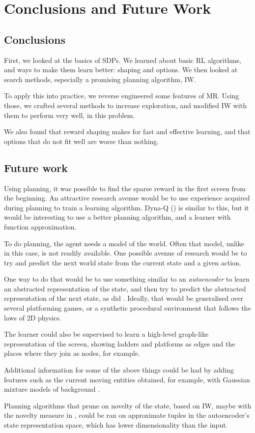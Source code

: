 \chapter{Conclusions and Future Work}
\section{Conclusions}
First, we looked at the basics of \aclp{SDP}. We learned about basic \acl{RL}
algorithms, and ways to make them learn better: shaping and options. We then
looked at search methods, especially a promising planning algorithm, \acl{IW}.

To apply this into practice, we reverse engineered some features of \acl{MR}.
Using those, we crafted several methods to increase exploration, and modified
\ac{IW} with them to perform very well, in this problem.

We also found that reward shaping makes for fast and effective learning, and
that options that do not fit well are worse than nothing.

\section{Future work}
Using planning, it was possible to find the sparse reward in the first screen
from the beginning. An attractive research avenue would be to use experience
acquired during planning to train a learning algorithm. Dyna-Q
(\cite[Section~9.2]{sutton1998introduction}) is similar to this, but it would be
interesting to use a better planning algorithm, and a learner with function approximation.

To do planning, the agent needs a model of the world. Often that model, unlike
in this case, is not readily available. One possible avenue of research would be
to try and predict the next world state from the current state and a given action.

One way to do that would be to use something similar to an \emph{autoencoder} to
learn an abstracted representation of the state, and then try to predict the
abstracted representation of the next state, as did \citet{oh2015action}.
Ideally, that would be generalised over several platforming games, or a
synthetic procedural environment that follows the laws of 2D physics.

The learner could also be supervised to learn a high-level graph-like
representation of the screen, showing ladders and platforms as edges and the
places where they join as nodes, for example.

Additional information for some of the above things could be had by adding
features such as the current moving entities obtained, for example, with
Gaussian mixture models of background \citep{stauffer1999adaptive}.

Planning algorithms that prune on novelty of the state, based on \acl{IW}, maybe
with the novelty measure in \citet{bellemare2016unifying}, could be ran on
approximate tuples in the autoencoder's state representation space, which has
lower dimensionality than the input.

